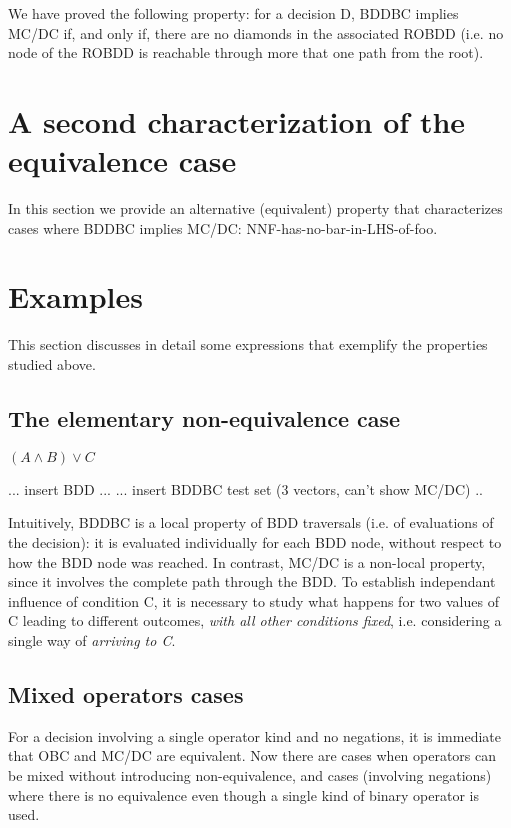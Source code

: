 \documentclass[a4paper,12pt,twoside]{article}
\begin{document}
We have proved the following property: for a decision D, BDDBC implies
MC/DC if, and only if, there are no diamonds in the associated ROBDD (i.e.
no node of the ROBDD is reachable through more that one path from the root).

\section{A second characterization of the equivalence case}

In this section we provide an alternative (equivalent) property
that characterizes cases where BDDBC implies MC/DC:
NNF-has-no-bar-in-LHS-of-foo.

\section{Examples}

This section discusses in detail some expressions that exemplify the properties
studied above.

\subsection{The elementary non-equivalence case}

$(A \land B) \lor C$

... insert BDD ...
... insert BDDBC test set (3 vectors, can't show MC/DC) ..

Intuitively, BDDBC is a local property of BDD traversals (i.e. of evaluations
of the decision): it is evaluated individually for each BDD node, without
respect to how the BDD node was reached. In contrast, MC/DC is a non-local
property, since it involves the complete path through the BDD. To establish
independant influence of condition C, it is necessary to study what happens
for two values of C leading to different outcomes, \emph{with all other
conditions fixed}, i.e. considering a single way of \emph{arriving to C}.

\subsection{Mixed operators cases}

For a decision involving a single operator kind and no negations, it is
immediate that OBC and MC/DC are equivalent. Now there are cases when
operators can be mixed without introducing non-equivalence, and cases
(involving negations) where there is no equivalence even though a single
kind of binary operator is used.
\end{document}
